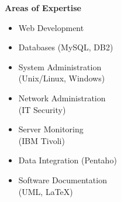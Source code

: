 %
\begin{minipage}[t]{.35\linewidth}
\vspace{0pt}
\textbf{Areas of Expertise}
\begin{itemize}[itemsep=0pt]
    \item Web Development
    \item Databases (MySQL, DB2)
    \item System Administration \\ (Unix/Linux, Windows)
    \item Network Administration \\ (IT Security)
    \item Server Monitoring \\ (IBM Tivoli)
    \item Data Integration (Pentaho)
    \item Software Documentation \\ (UML, LaTeX)
\end{itemize}
\end{minipage}